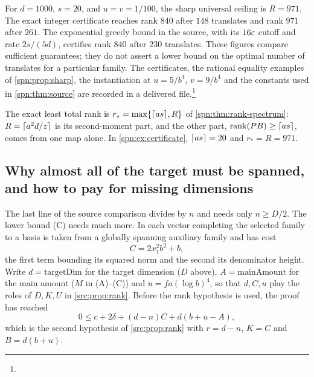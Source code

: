\begin{example}\label{spn:ex:certificate}
For $d=1000$, $s=20$, and $u=v=1/100$, the sharp universal ceiling is $R=971$.
The exact integer certificate reaches rank $840$ after $148$ translates and
rank $971$ after $261$. The exponential greedy bound in the source, with its
$16\varepsilon$ cutoff and rate $2s/(5d)$, certifies rank $840$ after $230$
translates. These figures compare sufficient guarantees; they do not assert a
lower bound on the optimal number of translates for a particular family. The
certificates, the rational equality examples of \cref{spn:prop:sharp}, the
instantiation at $u=5/b^4$, $v=9/b^4$ and the constants used in
\cref{spn:thm:source} are recorded in a delivered
file.\footnote{}
\end{example}

The exact least total rank is $r_*=\max\{\lceil as\rceil,R\}$ of
\cref{spn:thm:rank-spectrum}: $R=\lceil a^2d/z\rceil$ is its second-moment part, and
the other part, $\operatorname{rank}(PB)\ge\lceil as\rceil$, comes from one map alone. In
\cref{spn:ex:certificate}, $\lceil as\rceil=20$ and $r_*=R=971$.


\subsection{Why almost all of the target must be spanned, and how to pay for missing dimensions}\label{src:sec:span}\label{spn:sec:missing}
\begingroup\raggedright
{}
\endgroup

The last line of the source comparison divides by $n$ and needs only $n\ge D/2$. The lower
bound (C) needs much more. In  each vector completing the selected
family to a basis is taken from a globally spanning auxiliary family and has cost
\[
C=2x_1^2b^2+b ,
\]
the first term bounding its squared norm and the second its denominator height. Write
$d=\mathrm{targetDim}$ for the target dimension ($D$ above), $A=\mathrm{mainAmount}$ for the
main amount ($M$ in (A)--(C)) and $u=fa(\log b)^4$, so that $d,C,u$ play the roles of $D,K,U$ in
\cref{src:prop:rank}. Before the rank hypothesis is used, the proof has reached
\begin{equation}\label{spn:eq:source-before-rank}
 0\le c+2\delta+(d-n)C+d(b+u-A),
\end{equation}
which is the second hypothesis of \cref{src:prop:rank} with $r=d-n$, $K=C$ and $B=d(b+u)$.

